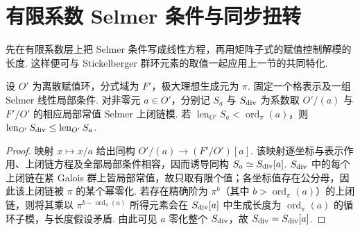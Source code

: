 \section{有限系数 Selmer 条件与同步扭转}
\label{sec:c-selmer-synch}

先在有限系数层上把 Selmer 条件写成线性方程，再用矩阵子式的赋值控制解模的长度. 这样便可与 Stickelberger 群环元素的取值一起应用上一节的共同特化.

\begin{lemma}
\label{lem:c-selmer-torsion-to-divisible}
\emitthmsource
设 $O'$ 为离散赋值环，分式域为 $F'$，极大理想生成元为 $\pi$.
固定一个格表示及一组 Selmer 线性局部条件.
对非零元 $a\in O'$，分别记 $S_a$ 与 $S_{\rm div}$ 为系数取 $O'/(a)$ 与 $F'/O'$ 的相应局部常值 Selmer 上闭链模.
若 $\operatorname{len}_{O'}S_a<\operatorname{ord}_\pi(a)$，则 $\operatorname{len}_{O'}S_{\rm div}\le\operatorname{len}_{O'}S_a$.
\end{lemma}
\begin{proof}
映射 $x\mapsto x/a$ 给出同构 $O'/(a)\to (F'/O')[a]$.
该映射逐坐标与表示作用、上闭链方程及全部局部条件相容，因而诱导同构 $S_a\simeq S_{\rm div}[a]$.
$S_{\rm div}$ 中的每个上闭链在紧 Galois 群上皆局部常值，故只取有限个值；各坐标值存在公分母，因此该上闭链被 $\pi$ 的某个幂零化.
若存在精确阶为 $\pi^b$（其中 $b>\operatorname{ord}_\pi(a)$）的上闭链，则将其乘以 $\pi^{b-\operatorname{ord}_\pi(a)}$ 所得元素会在 $S_{\rm div}[a]$ 中生成长度为 $\operatorname{ord}_\pi(a)$ 的循环子模，与长度假设矛盾.
由此可见 $a$ 零化整个 $S_{\rm div}$，故 $S_{\rm div}=S_{\rm div}[a]$.
\end{proof}


